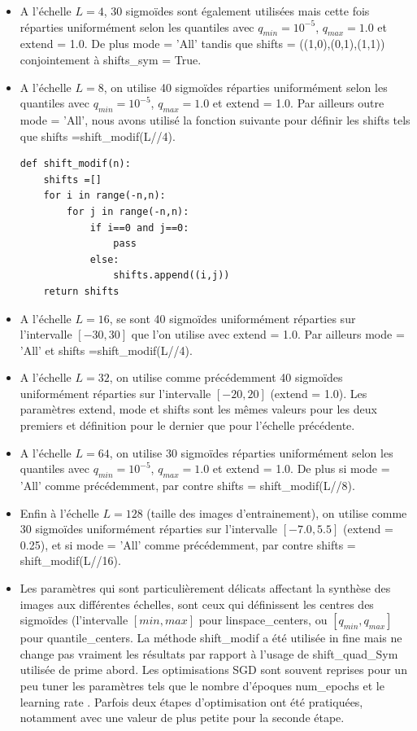 \documentclass[12pt,twoside]{article}
\newcommand{\itemb}{\item[$\bullet$]}
\begin{document}
\begin{itemize}
%
\itemb A l'échelle $L=4$,  30 sigmoïdes sont également utilisées mais cette fois réparties uniformément selon les quantiles avec $q_{min}=10^{-5}$, $q_{max}=1.0$ et \textsf{extend = 1.0}. De plus \textsf{mode = 'All'} tandis que \textsf{shifts = ((1,0),(0,1),(1,1))} conjointement à \textsf{shifts\_sym = True}.
%
\itemb A l'échelle $L=8$, on utilise 40 sigmoïdes réparties uniformément selon les quantiles avec $q_{min}=10^{-5}$, $q_{max}=1.0$ et \textsf{extend = 1.0}. Par ailleurs outre \textsf{mode = 'All'}, nous avons utilisé la fonction suivante pour définir les shifts tels que 
\textsf{shifts =shift\_modif(L//4)}.
\begin{lstlisting}[language=iPython]
def shift_modif(n):
    shifts =[]
    for i in range(-n,n):
        for j in range(-n,n):
            if i==0 and j==0:
                pass
            else:
                shifts.append((i,j))
    return shifts
\end{lstlisting}
%
\itemb A l'échelle $L=16$, se sont 40 sigmoïdes uniformément réparties sur l'intervalle $[-30, 30]$ que l'on utilise avec \textsf{extend = 1.0}. Par ailleurs \textsf{mode = 'All'} et 
\textsf{shifts =shift\_modif(L//4)}.
%
\itemb A l'échelle $L=32$, on utilise comme précédemment 40 sigmoïdes uniformément réparties sur l'intervalle $[-20, 20]$ (\textsf{extend = 1.0}). Les paramètres \textsf{extend}, \textsf{mode} et \textsf{shifts} sont les mêmes valeurs pour les deux premiers et définition pour le dernier que pour l'échelle précédente.
%
\itemb A l'échelle $L=64$, on utilise 30 sigmoïdes réparties uniformément selon les quantiles avec $q_{min}=10^{-5}$, $q_{max}=1.0$ et \textsf{extend = 1.0}. De plus si \textsf{mode = 'All'} comme précédemment, par contre \textsf{shifts = shift\_modif(L//8)}.
%
\itemb Enfin à l'échelle $L=128$ (taille des images d'entrainement), on utilise comme  30 sigmoïdes uniformément réparties sur l'intervalle $[-7.0, 5.5]$ (\textsf{extend = 0.25}), et si \textsf{mode = 'All'} comme précédemment, par contre \textsf{shifts = shift\_modif(L//16)}.
%
\itemb Les paramètres qui sont particulièrement délicats affectant la synthèse des images aux différentes échelles, sont ceux qui définissent les centres des sigmoïdes (l'intervalle $[min,max]$ pour \textsf{linspace\_centers}, ou $[q_{min},q_{max}]$ pour \textsf{quantile\_centers}. La méthode \textsf{shift\_modif} a été utilisée in fine mais ne change pas vraiment les résultats par rapport à l'usage de \textsf{shift\_quad\_Sym} utilisée de prime abord. Les optimisations SGD sont souvent reprises pour un peu tuner les paramètres tels que le nombre d'époques \textsf{num\_epochs} et le learning rate . Parfois deux étapes d'optimisation ont été pratiquées, notamment avec une valeur de   plus petite pour la seconde étape.
\end{itemize}
%
\end{document}
